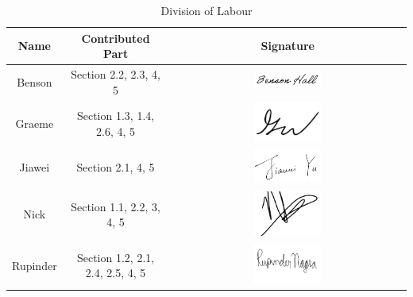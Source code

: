 \documentclass[]{article}
\begin{document}
\begin{table}[h]
    \centering
    \begin{tabular}{|c|c|c|}
    \hline
        \textbf{Name} & \textbf{Contributed Part} & \textbf{Signature} \\
        \hline
        Benson & Section 2.2, 2.3, 4, 5 & \includegraphics[width=0.3\textwidth]{signatures/bensonsignature.JPG}\\
        \hline
        Graeme & Section 1.3, 1.4, 2.6, 4, 5 & \includegraphics[width=0.3\textwidth]{signatures/graeme_signature.png} \\
        \hline
        Jiawei & Section 2.1, 4, 5 & \includegraphics[width=0.3\textwidth]{signatures/Signature_Jiawei.PNG}\\
        \hline
        Nick & Section 1.1, 2.2, 3, 4, 5 & \includegraphics[width=0.3\textwidth]{signatures/nick signature.PNG} \\
        \hline
        Rupinder & Section 1.2, 2.1, 2.4, 2.5, 4, 5 & \includegraphics[width=0.3\textwidth]{signatures/Rupinder Signature.png}\\
        \hline
    \end{tabular}
    \caption{Division of Labour}
    \label{tab:my_label}
\end{table}

\end{document}
